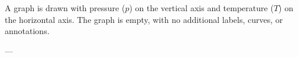 A graph is drawn with pressure (\( p \)) on the vertical axis and temperature (\( T \)) on the horizontal axis. The graph is empty, with no additional labels, curves, or annotations.

---
